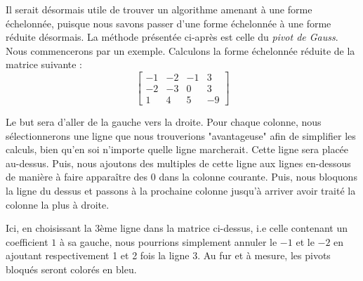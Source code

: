 \documentclass{article}
\begin{document}
\noindent Il serait désormais utile de trouver un algorithme amenant à une forme échelonnée, puisque nous savons passer d'une forme échelonnée à une forme réduite désormais. La méthode présentée ci-après est celle du \textit{pivot de Gauss}.\\

\noindent Nous commencerons par un exemple. Calculons la forme échelonnée réduite de la matrice suivante :
$$\begin{bmatrix}
-1 & -2 & -1 & 3 \\
-2 & -3 &  0 & 3 \\
1  &  4 &  5 & -9
\end{bmatrix}
$$
\begin{mdframed}
Le but sera d'aller de la gauche vers la droite. Pour chaque colonne, nous sélectionnerons une ligne que nous trouverions "avantageuse" afin de simplifier les calculs, bien qu'en soi n'importe quelle ligne marcherait. Cette ligne sera placée au-dessus. Puis, nous ajoutons des multiples de cette ligne aux lignes en-dessous de manière à faire apparaître des 0 dans la colonne courante. Puis, nous bloquons la ligne du dessus et passons à la prochaine colonne jusqu'à arriver avoir traité la colonne la plus à droite.
\end{mdframed}

\noindent Ici, en choisissant la 3ème ligne dans la matrice ci-dessus, i.e celle contenant un coefficient $1$ à sa gauche, nous pourrions simplement annuler le $-1$ et le $-2$ en ajoutant respectivement 1 et 2 fois la ligne 3. Au fur et à mesure, les pivots bloqués seront colorés en bleu.\\
\end{document}
